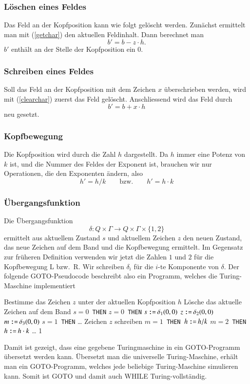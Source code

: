 \subsubsection{Löschen eines Feldes}
Das Feld an der Kopfposition kann wie folgt gelöscht werden.
Zunächst ermittelt man mit (\ref{getchar}) den aktuellen Feldinhalt.
Dann berechnet man
\begin{equation}
b' = b - z\cdot h.
\label{clearchar}
\end{equation}
$b'$ enthält an der Stelle der Kopfposition ein $0$.

\subsubsection{Schreiben eines Feldes}
Soll das Feld an der Kopfposition mit dem Zeichen $x$ überschrieben
werden, wird mit (\ref{clearchar}) zuerst das Feld gelöscht.
Anschliessend wird das Feld durch
\[
b'=b+x\cdot h
\]
neu gesetzt.

\subsubsection{Kopfbewegung}
Die Kopfposition wird durch die Zahl $h$ dargestellt.
Da $h$ immer eine Potenz von $k$ ist, und die Nummer des Feldes der
Exponent ist, brauchen wir nur Operationen, die den Exponenten
ändern, also
\[
h'=h/k\qquad\text{bzw.}\qquad h'=h\cdot k
\]

\subsubsection{Übergangsfunktion}
Die Übergangsfunktion
\[
\delta\colon Q\times \Gamma\to Q\times \Gamma\times\{1, 2\}
\]
ermittelt aus aktuellem Zustand $s$ und
aktuellem Zeichen $z$ den neuen Zustand, das neue Zeichen auf
dem Band und die Kopfbewegung ermittelt.
Im Gegensatz zur früheren
Definition verwenden wir jetzt die Zahlen $1$ und $2$ für die
Kopfbewegung L bzw.~R.
Wir schreiben $\delta_i$ für die $i$-te Komponente von $\delta$.
Der folgende GOTO-Pseudocode
beschreibt also ein Programm, welches die Turing-Maschine implementiert
\begin{algorithmic}[1]
\STATE Bestimme das Zeichen $z$ unter der aktuellen Kopfposition $h$
\STATE Lösche das aktuelle Zeichen auf dem Band
$s=0${\tt\ THEN}
$z=0${\tt\ THEN}
\STATE {\tt \ \ \ \ \ \ \ \ }$s\mathbin{\texttt{:=}}\delta_1(0,0)$
\STATE {\tt \ \ \ \ \ \ \ \ }$z\mathbin{\texttt{:=}}\delta_2(0,0)$
\STATE {\tt \ \ \ \ \ \ \ \ }$m\mathbin{\texttt{:=}}\delta_3(0,0)$
$s=1${\tt\ THEN}
\STATE {\tt \ \ \ \ }\dots
{}
\STATE Zeichen $z$ schreiben
$m=1${\tt\ THEN }$h\mathbin{\texttt{:=}} h/k$
$m=2${\tt\ THEN }$h\mathbin{\texttt{:=}} h\cdot k$
\STATE \dots
{}1
\end{algorithmic}
Damit ist gezeigt, dass eine gegebene Turingmaschine in ein
GOTO-Programm übersetzt werden kann.
Übersetzt man die universelle
Turing-Maschine, erhält man ein GOTO-Programm, welches jede beliebige
Turing-Maschine simulieren kann.
Somit ist GOTO und damit auch WHILE Turing-vollständig.

